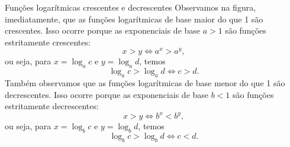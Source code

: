 \begin{observation}{Funções logarítmicas crescentes e decrescentes}
Observamos na figura, imediatamente, que as funções logarítmicas de base maior do que 1 são crescentes. Isso ocorre porque as exponenciais de base $a>1$ são funções estritamente crescentes:
$$
x > y \Longleftrightarrow a^x > a^y,
$$
ou seja, para $x=\log_a c$ e $y=\log_a d$, temos
$$
\log_a c > \log_a d \Longleftrightarrow c > d.
$$
Também observamos que as funções logarítmicas de base menor do que 1 são decrescentes. Isso ocorre porque as exponenciais de base $b<1$ são funções estritamente decrescentes:
$$
x > y \Longleftrightarrow b^x < b^y,
$$
ou seja, para $x=\log_b c$ e $y=\log_b d$, temos
$$
\log_b c > \log_b d \Longleftrightarrow c < d.
$$

\end{observation}

